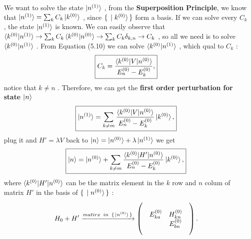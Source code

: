 \documentclass[11pt,a4paper]{report}
\begin{document}
We want to solve the state $\ket{n^{(1)}}$ , from the {\bf Superposition Principle}, we know that $\ket{n^{(1)}}=\sum_k{C_k \ket{k^{(0)}}}$ , since $\set{\ket{k^{(0)}}}$ form a basis. If we can solve every $C_k$ , the state $\ket{n^{(1)}}$ is known. We can easily observe that $\braket{k^{(0)} | n^{(1)}} \to \sum_k{ C_k \braket{ k^{(0)} | n^{(0)} } } \to \sum_k{ C_k \delta_{k,n} } \to C_k$ , so all we need is to solve $\braket{ k^{(0)} | n^{(1)} }$ . 
\newpage From Equation (5.10) we can solve $\braket{ k^{(0)} | n^{(1)} }$ , which qual to $C_k$ :
\begin{equation}
    \boxed{ C_k = \frac{\braket{k^{(0)}|V|n^{(0)}}}{E^{(0)}_n-E^{(0)}_k} , }
\end{equation}
notice that $k\neq n$ . Therefore, we can get the {\bf first order perturbation for state $\ket{n}$ }
\begin{equation}
    \boxed{ \ket{n^{(1)}} = \sum_{k\neq m} \frac{ \braket{ k^{(0)}|V | n^{(0)} } }{ E^{(0)}_n - E^{(0)}_k } \ket{ k^{(0)}}, }
\end{equation}
plug it and $H'=\lambda V$ back to $ \ket{n} = \ket{n^{(0)}} + \lambda \ket{n^{(1)}} $ we get 
\begin{equation}
    \boxed{ \ket{n} = \ket{n^{(0)}} + \sum_{k\neq m} \frac{ \braket{ k^{(0)}|H'| n^{(0)} } }{ E^{(0)}_n - E^{(0)}_k } \ket{ k^{(0)}} , }
\end{equation}
where $\braket{k^{(0)}|H'|n^{(0)}}$ can be the matrix element in the $k$ row and $n$ colum of matrix $H'$ in the basis of $\set{\ket{n^{(0)}}}$ :
\[ H_0+H' \xrightarrow{matirx \hspace{1ex} in \hspace{1ex} \set{\ket{n^{(0)}}}} 
\begin{pmatrix}
    &  &  &  \\
    & E^{(0)}_{ka} & H^{(0)}_{kn} & \\
    &  & E^{(0)}_{bn} & \\
    &  & & \\
\end{pmatrix} . \] 
\end{document}
